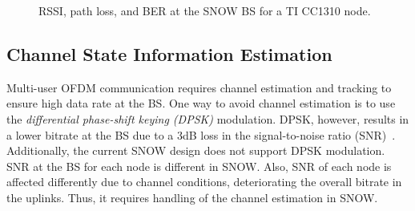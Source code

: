 
\begin{figure*}[!htbp] 
    \centering
      \hfill
      \hfill
    \caption{RSSI, path loss, and BER at the SNOW BS for a TI CC1310 node.}
    \label{fig:csi}
 \end{figure*}
\subsection{Channel State Information Estimation}\label{sec:csi}

Multi-user OFDM communication requires channel estimation and tracking to ensure high data rate at the BS. One way to avoid channel estimation is to use the \emph{differential phase-shift keying (DPSK)} modulation. DPSK, however, results in a lower bitrate at the BS due to a 3dB loss in the signal-to-noise ratio (SNR)~\cite{van1995channel}. Additionally, the current SNOW design does not support DPSK modulation. SNR at the BS for each node is different in SNOW. Also, SNR of each node is affected differently due to channel conditions, deteriorating the overall bitrate in the uplinks. Thus, it requires handling of the channel estimation in SNOW.

